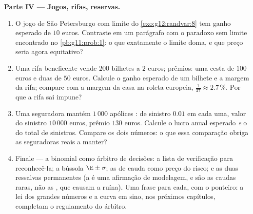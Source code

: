 \begin{problem}
\medskip
\noindent\textbf{Parte IV --- Jogos, rifas, reservas.}
\begin{enumerate}[resume]
  \item O jogo de São Petersburgo com limite do
        \cref{exo:g12:randvar:8} tem ganho esperado de $10$
        euros. Contraste em um parágrafo com o paradoxo sem
        limite encontrado no \cref{pb:g11:prob:1}: o que
        exatamente o limite doma, e que preço seria agora
        equitativo?
  \item Uma rifa beneficente vende $200$ bilhetes a $2$ euros;
        prêmios: uma cesta de $100$ euros e duas de $50$ euros.
        Calcule o ganho esperado de um bilhete e a margem da
        rifa; compare com a margem da casa na roleta europeia,
        $\frac{1}{37} \approx 2.7\,\%$. Por que a rifa sai
        impune?
  \item Uma seguradora mantém $1\,000$ apólices :
         de sinistro $0.01$ em cada uma, valor do
        sinistro $10\,000$ euros, prêmio $130$ euros. Calcule o
        lucro anual esperado \emph{e} o  do total
        de sinistros. Compare os dois números: o que essa
        comparação obriga as seguradoras reais a manter?
  \item Finale --- a binomial como árbitro de decisões: a lista
        de verificação para reconhecê-la; a bússola
        $\E \pm \sigma$; as  de cauda como preço
        do risco; e as duas ressalvas permanentes (a
         é uma afirmação de modelagem, e são as
        caudas raras, não as , que causam a ruína). Uma
        frase para cada, com o ponteiro: a lei dos grandes
        números e a curva em sino, nos próximos capítulos,
        completam o regulamento do árbitro.
\end{enumerate}
\end{problem}
